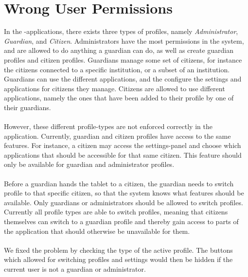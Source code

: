 \section{Wrong User Permissions}
\label{sec:wrong_user_permissions}

In the \giraf-applications, there exists three types of profiles, namely \emph{Administrator}, \emph{Guardian}, and \emph{Citizen}. Administrators have the most permissions in the system, and are allowed to do anything a guardian can do, as well as create guardian profiles and citizen profiles. Guardians manage some set of citizens, for instance the citizens connected to a specific institution, or a subset of an institution. Guardians can use the different applications, and the configure the settings and applications for citizens they manage. Citizens are allowed to use different applications, namely the ones that have been added to their profile by one of their guardians. 
\\\\
However, these different profile-types are not enforced correctly in the \launcher application. Currently, guardian and citizen profiles have access to the same features. For instance, a citizen may access the settings-panel and choose which applications that should be accessible for that same citizen. This feature should only be available for guardian and administrator profiles.
\\\\
Before a guardian hands the tablet to a citizen, the guardian needs to switch profile to that specific citizen, so that the system knows what features should be available. Only guardians or administrators should be allowed to switch profiles. Currently all profile types are able to switch profiles, meaning that citizens themselves can switch to a guardian profile and thereby gain access to parts of the application that should otherwise be unavailable for them.
\\\\
We fixed the problem by checking the type of the active profile. The buttons which allowed for switching profiles and settings would then be hidden if the current user is not a guardian or administrator.